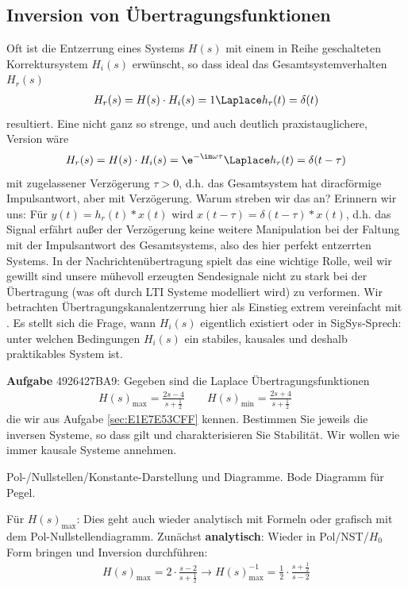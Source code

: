 \newpage
\subsection{Inversion von Übertragungsfunktionen}
\label{sec:4926427BA9}
\begin{Ziel}
Oft ist die Entzerrung eines Systems $H(s)$ mit einem in Reihe
geschalteten Korrektursystem $H_i(s)$
erwünscht, so dass ideal das Gesamtsystemverhalten $H_r(s)$
\begin{align}
\label{eq:4926427BA9_EQing}
  H_r(s) = H(s)\cdot H_i(s) = 1 \Laplace h_r(t)=\delta(t)
\end{align}
resultiert.
Eine nicht ganz so strenge, und auch deutlich praxistauglichere, Version wäre
\begin{align}
  H_r(s) = H(s)\cdot H_i(s) = \e^{-\im\omega\tau} \Laplace h_r(t)=\delta(t-\tau)
\end{align}
mit zugelassener Verzögerung $\tau>0$, d.h. das Gesamtsystem hat diracförmige
Impulsantwort, aber mit Verzögerung. Warum streben wir das an? Erinnern wir uns:
Für $y(t) = h_r(t)\ast x(t)$ wird $x(t-\tau) = \delta(t-\tau)\ast x(t)$, d.h.
das Signal erfährt außer der Verzögerung keine weitere Manipulation bei der Faltung
mit der Impulsantwort des Gesamtsystems, also des hier perfekt entzerrten Systems.
In der Nachrichtenübertragung spielt das eine wichtige Rolle, weil wir
gewillt sind unsere mühevoll erzeugten Sendesignale nicht zu stark
bei der Übertragung (was oft durch LTI Systeme modelliert wird) zu verformen.
Wir betrachten Übertragungskanalentzerrung hier als Einstieg extrem vereinfacht mit
. Es stellt sich die Frage, wann $H_i(s)$ eigentlich
existiert oder in SigSys-Sprech: unter welchen Bedingungen $H_i(s)$
ein stabiles, kausales und deshalb praktikables System ist.
\end{Ziel}
\textbf{Aufgabe} {\tiny 4926427BA9}: Gegeben sind die Laplace
Übertragungsfunktionen
\begin{align}
H(s)_\mathrm{max} = \frac{2 s-4}{s+\frac{1}{2}}\qquad
H(s)_\mathrm{min} = \frac{2 s+4}{s+\frac{1}{2}}\qquad
\end{align}
die wir aus Aufgabe \ref{sec:E1E7E53CFF} kennen.
Bestimmen Sie jeweils die inversen Systeme, so dass  gilt
und charakterisieren Sie Stabilität. Wir wollen wie immer kausale Systeme annehmen.

\begin{Werkzeug}
Pol-/Nullstellen/Konstante-Darstellung und Diagramme. Bode Diagramm für Pegel.
\end{Werkzeug}
\begin{Ansatz}
Für $H(s)_\mathrm{max}$:
Dies geht auch wieder analytisch mit Formeln oder grafisch mit dem
Pol-Nullstellendiagramm.
Zunächst \textbf{analytisch}:
Wieder in Pol/NST/$H_0$ Form bringen und Inversion durchführen:
\begin{align}
H(s)_\mathrm{max} = 2\cdot\frac{s-2}{s+\frac{1}{2}}\rightarrow
H(s)_\mathrm{max}^{-1} = \frac{1}{2}\cdot\frac{s+\frac{1}{2}}{s-2}
\end{align}
\end{Ansatz}

